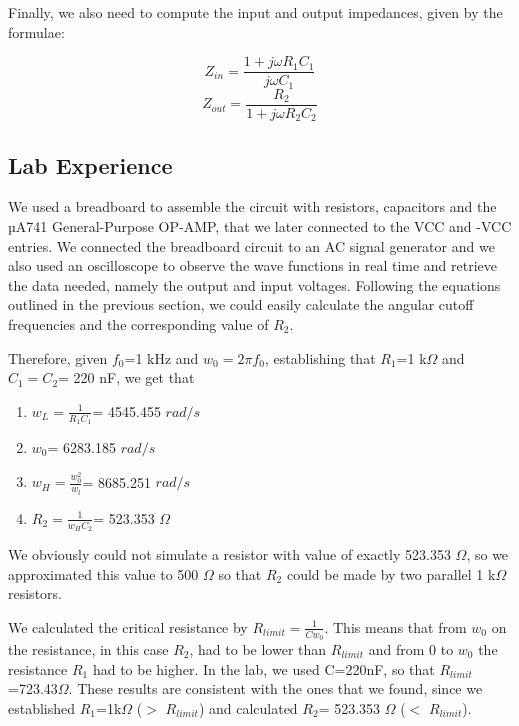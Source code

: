 Finally, we also need to compute the input and output impedances, given by the formulae:

\begin{equation}
    Z_{in} = \frac{1+j\omega R_1 C_1}{j\omega C_1}
\label{z_in}
\end{equation}
\begin{equation}
    Z_{out} = \frac{R_2}{1+j\omega R_2 C_2}
\label{z_out}
\end{equation}

\subsection{Lab Experience}

We used a breadboard to assemble the circuit with resistors, capacitors and the µA741 General-Purpose OP-AMP, that we later connected to the VCC and -VCC entries. We connected the breadboard circuit to an AC signal generator and we also used an oscilloscope to observe the wave functions in real time and retrieve the data needed, namely the output and input voltages. Following the equations outlined in the previous section, we could easily calculate the angular cutoff frequencies and the corresponding value of $R_2$.

Therefore, given $f_0$=1 kHz and $w_0=2\pi f_0$, establishing that $R_1$=1 k$\Omega$ and $C_1=C_2$= 220 nF, we get that 
\begin{enumerate}
    \item $w_L=\frac{1}{R_1 C_1}$= 4545.455 $rad/s$
    \item $w_0$= 6283.185 $rad/s$
    \item $w_H=\frac{w_0^{2}}{w_l}$= 8685.251 $rad/s$
    \item $R_2=\frac{1}{w_H C_2}$= 523.353 $\Omega$
\end{enumerate}
 
 We obviously could not simulate a resistor with value of exactly 523.353 $\Omega$, so we approximated this value to 500 $\Omega$ so that $R_2$ could be made by two parallel 1 k$\Omega$ resistors.\par
 
 We calculated the critical resistance by $R_{limit}=\frac{1}{C w_0}$. This means that from $w_0$ on the resistance, in this case $R_2$, had to be lower than $R_{limit}$ and from 0 to $w_0$ the resistance $R_1$ had to be higher. In the lab, we used C=220nF, so that $R_{limit}$=723.43$\Omega$. These results are consistent with the ones that we found, since we established $R_1$=1k$\Omega$ ($>$ $R_{limit}$) and calculated $R_2$= 523.353 $\Omega$ ($<$ $R_{limit}$).
 
